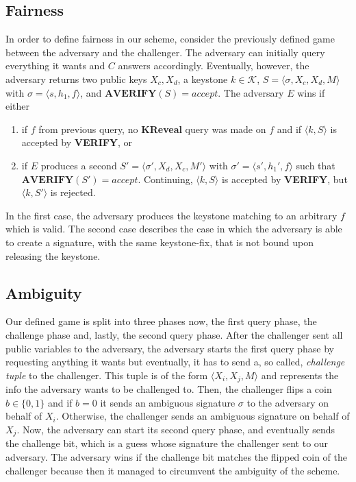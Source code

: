 \documentclass[final]{IEEEtran}%
\newcommand{\goedel}[1]{\langle #1 \rangle}
\newcommand{\kspace}{\mathcal{K}}
\newcommand{\Set}[1]{\ensuremath{ \{ #1 \}}}
\begin{document}
  \subsection{Fairness}
    In order to define fairness in our scheme, consider the previously defined game between the adversary and the challenger.
    The adversary can initially query everything it wants and \(C\) answers accordingly.
    Eventually, however, the adversary returns two public keys \(X_c, X_d\), a keystone \(k\in\kspace\), \(S=\goedel{\sigma, X_c, X_d, M}\) with \(\sigma=\goedel{s, h_1, f}\), and \(\textbf{AVERIFY}(S) = accept\).
    The adversary \(E\) wins if either
      \begin{enumerate}
        \item if \(f\) from previous query, no \textbf{KReveal} query was made on \(f\) and if \(\goedel{k,S}\) is accepted by \textbf{VERIFY}, or
        \item if \(E\) produces a second \(S' = \goedel{\sigma', X_d, X_c, M'}\) with \(\sigma' = \goedel{s', h_1', f}\) such that \(\textbf{AVERIFY}(S')=accept\).
              Continuing, \(\goedel{k,S}\) is accepted by \textbf{VERIFY}, but  \(\goedel{k,S'}\) is rejected.
      \end{enumerate}
    In the first case, the adversary produces the keystone matching to an arbitrary \(f\) which is valid.
    The second case describes the case in which the adversary is able to create a signature, with the same keystone-fix, that is not bound upon releasing the keystone.

  \subsection{Ambiguity}
    Our defined game is split into three phases now, the first query phase, the challenge phase and, lastly, the second query phase. 
    After the challenger sent all public variables to the adversary, the adversary starts the first query phase by requesting anything it wants but eventually, it has to send a, so called, \textit{challenge tuple} to the challenger.
    This tuple is of the form \(\goedel{X_i, X_j, M}\) and represents the info the adversary wants to be challenged to.
    Then, the challenger flips a coin \(b\in\Set{0,1}\) and if \(b = 0\) it sends an ambiguous signature \(\sigma\) to the adversary on behalf of \(X_i\).
    Otherwise, the challenger sends an ambiguous signature on behalf of \(X_j\). Now, the adversary can start its second query phase, and eventually sends the challenge bit, which is a guess whose signature the challenger sent to our adversary.
    The adversary wins if the challenge bit matches the flipped coin of the challenger because then it managed to circumvent the ambiguity of the scheme.
  
\end{document}
